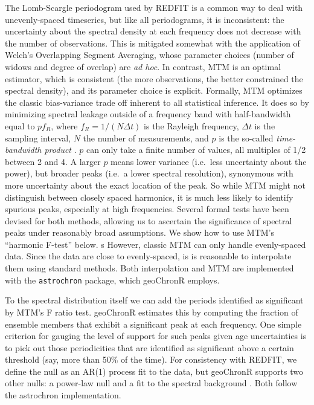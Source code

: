 \documentclass[gchron, manuscript]{copernicus}
\begin{document}
The Lomb-Scargle periodogram used by REDFIT is a common way to deal with unevenly-spaced timeseries, but like all periodograms, it is inconsistent: the uncertainty about the spectral density at each frequency does not decrease with the number of observations. This is mitigated somewhat with the application of Welch's Overlapping Segment Averaging, whose parameter choices (number of widows and degree of overlap) are \emph{ad hoc}.
In contrast, MTM \citep{thomson82} is an optimal estimator, which is consistent (the more observations, the better constrained the spectral density), and its parameter choice is explicit. Formally, MTM optimizes the classic bias-variance trade off inherent to all statistical inference.
It does so by minimizing spectral leakage outside of a frequency band with half-bandwidth equal to \(pf_R\), where \(f_R=1/(N \Delta t)\) is the Rayleigh frequency, \(\Delta t\) is the sampling interval, \(N\) the number of measurements, and \(p\) is the so-called \emph{time-bandwidth product} \citep{Ghil02}.
\(p\) can only take a finite number of values, all multiples of 1/2 between 2 and 4.
A larger \(p\) means lower variance (i.e.~less uncertainty about the power), but broader peaks (i.e.~a lower spectral resolution), synonymous with more uncertainty about the exact location of the peak.
So while MTM might not distinguish between closely spaced harmonics, it is much less likely to identify spurious peaks, especially at high frequencies.
Several formal tests have been devised for both methods, allowing us to ascertain the significance of spectral peaks under reasonably broad assumptions. We show how to use MTM's ``harmonic F-test'' below.
s
However, classic MTM can only handle evenly-spaced data. Since the data are close to evenly-spaced, is is reasonable to interpolate them using standard methods. Both interpolation and MTM are implemented with the \texttt{astrochron} \citep{astrochron} package, which geoChronR employs.

To the spectral distribution itself we can add the periods identified as significant by MTM's F ratio test. geoChronR estimates this by computing the fraction of ensemble members that exhibit a significant peak at each frequency. One simple criterion for gauging the level of support for such peaks given age uncertainties is to pick out those periodicities that are identified as significant above a certain threshold (say, more than 50\% of the time). For consistency with REDFIT, we define the null as an AR(1) process fit to the data, but geoChronR supports two other nulls: a power-law null and a fit to the spectral background \citep{MannLees96}.
Both follow the astrochron implementation.
\end{document}
